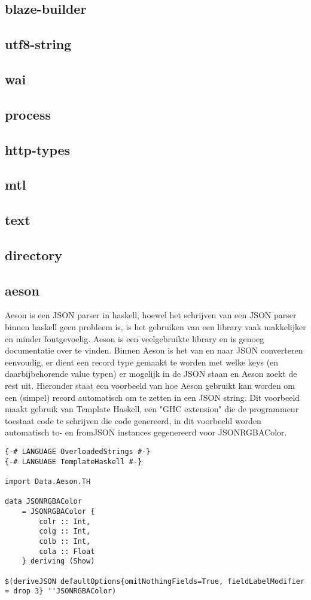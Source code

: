 \subsection{blaze-builder}
\subsection{utf8-string}
\subsection{wai}
\subsection{process}
\subsection{http-types}
\subsection{mtl}
\subsection{text}
\subsection{directory}
\subsection{aeson}
Aeson is een JSON parser in haskell, hoewel het schrijven van een JSON parser binnen haskell geen probleem is, is het gebruiken van een library vaak makkelijker en minder foutgevoelig. Aeson is een veelgebruikte library en is genoeg documentatie over te vinden. Binnen Aeson is het van en naar JSON converteren eenvoudig, er dient een record type gemaakt te worden met welke keys (en daarbijbehorende value typen) er mogelijk in de JSON staan en Aeson zoekt de rest uit. Hieronder staat een voorbeeld van hoe Aeson gebruikt kan worden om een (simpel) record automatisch om te zetten in een JSON string. Dit voorbeeld maakt gebruik van Template Haskell, een "GHC extension" die de programmeur toestaat code te schrijven die code genereerd, in dit voorbeeld worden automatisch to- en fromJSON instances gegenereerd voor JSONRGBAColor.
\begin{lstlisting}
{-# LANGUAGE OverloadedStrings #-}
{-# LANGUAGE TemplateHaskell #-}

import Data.Aeson.TH

data JSONRGBAColor
    = JSONRGBAColor {
        colr :: Int,
        colg :: Int,
        colb :: Int,
        cola :: Float
    } deriving (Show)

$(deriveJSON defaultOptions{omitNothingFields=True, fieldLabelModifier = drop 3} ''JSONRGBAColor)
\end{lstlisting} 
